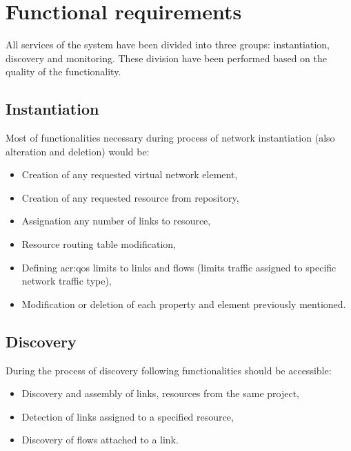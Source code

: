 \documentclass[11pt]{book}
\begin{document}
    \section{Functional requirements}
    \label{sec:req:func}

      All services of the system have been divided into three groups: instantiation, discovery and monitoring. These
      division have been performed based on the quality of the functionality.


      \subsection{Instantiation}
      \label{sec:req:func:inst}

        Most of functionalities necessary during process of network instantiation (also alteration and deletion) would
        be:

        \begin{itemize}
          \item Creation of any requested virtual network element,
          \item Creation of any requested resource from repository,
          \item Assignation any number of links to resource,
          \item Resource routing table modification,
          \item Defining \gls{acr:qos} limits to links and flows (limits traffic assigned to specific network traffic type),
          \item Modification or deletion of each property and element previously mentioned.
        \end{itemize}


      \subsection{Discovery}
      \label{sec:req:func:disc}

        During the process of discovery following functionalities should be accessible:

        \begin{itemize}
          \item Discovery and assembly of links, resources from the same project,
          \item Detection of links assigned to a specified resource,
          \item Discovery of flows attached to a link.
        \end{itemize}
\end{document}
